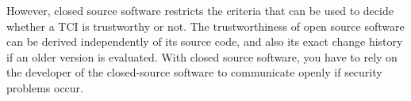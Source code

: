 However, closed source software restricts the criteria that can be used to decide whether a TCI is trustworthy or not.
The trustworthiness of open source software can be derived independently of its source code, and also its exact change history if an older version is evaluated.
With closed source software, you have to rely on the developer of the closed-source software to communicate openly if security problems occur.










